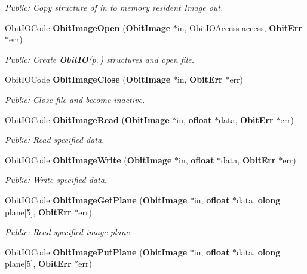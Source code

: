 \begin{CompactItemize}
\begin{CompactList}\small\item\em Public: Copy structure of in to memory resident Image out. \item\end{CompactList}\item 
Obit\-IOCode {\bf Obit\-Image\-Open} ({\bf Obit\-Image} $\ast$in, Obit\-IOAccess access, {\bf Obit\-Err} $\ast$err)
\begin{CompactList}\small\item\em Public: Create {\bf Obit\-IO}{\rm (p.\,\pageref{structObitIO})} structures and open file. \item\end{CompactList}\item 
Obit\-IOCode {\bf Obit\-Image\-Close} ({\bf Obit\-Image} $\ast$in, {\bf Obit\-Err} $\ast$err)
\begin{CompactList}\small\item\em Public: Close file and become inactive. \item\end{CompactList}\item 
Obit\-IOCode {\bf Obit\-Image\-Read} ({\bf Obit\-Image} $\ast$in, {\bf ofloat} $\ast$data, {\bf Obit\-Err} $\ast$err)
\begin{CompactList}\small\item\em Public: Read specified data. \item\end{CompactList}\item 
Obit\-IOCode {\bf Obit\-Image\-Write} ({\bf Obit\-Image} $\ast$in, {\bf ofloat} $\ast$data, {\bf Obit\-Err} $\ast$err)
\begin{CompactList}\small\item\em Public: Write specified data. \item\end{CompactList}\item 
Obit\-IOCode {\bf Obit\-Image\-Get\-Plane} ({\bf Obit\-Image} $\ast$in, {\bf ofloat} $\ast$data, {\bf olong} plane[5], {\bf Obit\-Err} $\ast$err)
\begin{CompactList}\small\item\em Public: Read specified image plane. \item\end{CompactList}\item 
Obit\-IOCode {\bf Obit\-Image\-Put\-Plane} ({\bf Obit\-Image} $\ast$in, {\bf ofloat} $\ast$data, {\bf olong} plane[5], {\bf Obit\-Err} $\ast$err)

\end{CompactItemize}
